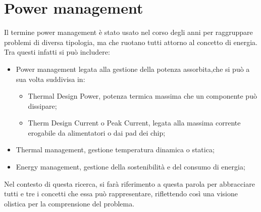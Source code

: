 \chapter{Power management}
Il termine power management è stato usato nel corso degli anni per raggruppare problemi di diversa tipologia, ma che ruotano tutti attorno al concetto di energia.
Tra questi infatti si può includere:
\begin{itemize}
    \item Power management legata alla gestione della potenza assorbita,che si può a sua volta suddivisa in:
    \begin{itemize}
        \item Thermal Design Power, potenza termica massima che un componente può dissipare;
        \item Therm Design Current o Peak Current, legata alla massima corrente erogabile da alimentatori o dai pad dei chip; %
    \end{itemize}
    \item Thermal management, gestione temperatura dinamica o statica;
    \item Energy management, gestione della sostenibilità e del consumo di energia;
\end{itemize}

Nel contesto di questa ricerca, si farà riferimento a questa parola per abbracciare tutti e tre i concetti che essa può rappresentare, riflettendo così una visione olistica per la comprensione del problema.   

